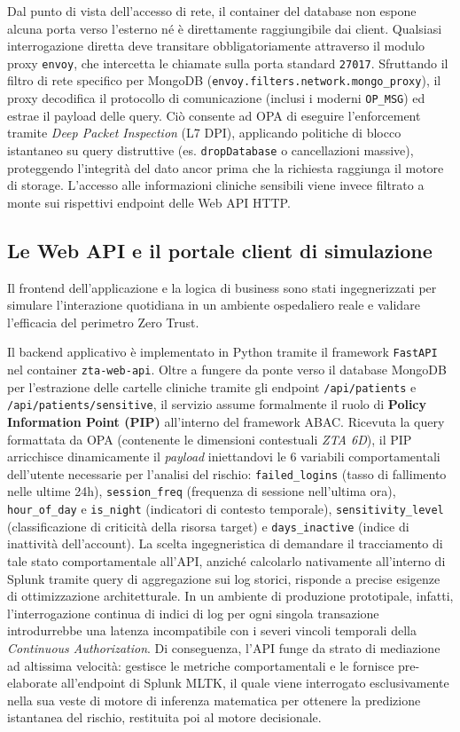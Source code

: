 Dal punto di vista dell'accesso di rete, il container del database non espone alcuna porta verso l'esterno né è direttamente raggiungibile dai client. Qualsiasi interrogazione diretta deve transitare obbligatoriamente attraverso il modulo proxy \texttt{envoy}, che intercetta le chiamate sulla porta standard \texttt{27017}. Sfruttando il filtro di rete specifico per MongoDB (\texttt{envoy.filters.network.mongo\_proxy}), il proxy decodifica il protocollo di comunicazione (inclusi i moderni \texttt{OP\_MSG}) ed estrae il payload delle query. Ciò consente ad OPA di eseguire l'enforcement tramite \textit{Deep Packet Inspection} (L7 DPI), applicando politiche di blocco istantaneo su query distruttive (es. \texttt{dropDatabase} o cancellazioni massive), proteggendo l'integrità del dato ancor prima che la richiesta raggiunga il motore di storage. L'accesso alle informazioni cliniche sensibili viene invece filtrato a monte sui rispettivi endpoint delle Web API HTTP.

\subsection{Le Web API e il portale client di simulazione}
Il frontend dell'applicazione e la logica di business sono stati ingegnerizzati per simulare l'interazione quotidiana in un ambiente ospedaliero reale e validare l'efficacia del perimetro Zero Trust.

Il backend applicativo è implementato in Python tramite il framework \texttt{FastAPI} nel container \texttt{zta-web-api}. Oltre a fungere da ponte verso il database MongoDB per l'estrazione delle cartelle cliniche tramite gli endpoint \texttt{/api/patients} e \texttt{/api/patients/sensitive}, il servizio assume formalmente il ruolo di \textbf{Policy Information Point (PIP)} all'interno del framework ABAC. Ricevuta la query formattata da OPA (contenente le dimensioni contestuali \textit{ZTA 6D}), il PIP arricchisce dinamicamente il \textit{payload} iniettandovi le 6 variabili comportamentali dell'utente necessarie per l'analisi del rischio: \texttt{failed\_logins} (tasso di fallimento nelle ultime 24h), \texttt{session\_freq} (frequenza di sessione nell'ultima ora), \texttt{hour\_of\_day} e \texttt{is\_night} (indicatori di contesto temporale), \texttt{sensitivity\_level} (classificazione di criticità della risorsa target) e \texttt{days\_inactive} (indice di inattività dell'account). La scelta ingegneristica di demandare il tracciamento di tale stato comportamentale all'API, anziché calcolarlo nativamente all'interno di Splunk tramite query di aggregazione sui log storici, risponde a precise esigenze di ottimizzazione architetturale. In un ambiente di produzione prototipale, infatti, l'interrogazione continua di indici di log per ogni singola transazione introdurrebbe una latenza incompatibile con i severi vincoli temporali della \textit{Continuous Authorization}. Di conseguenza, l'API funge da strato di mediazione ad altissima velocità: gestisce le metriche comportamentali e le fornisce pre-elaborate all'endpoint di Splunk MLTK, il quale viene interrogato esclusivamente nella sua veste di motore di inferenza matematica per ottenere la predizione istantanea del rischio, restituita poi al motore decisionale.

